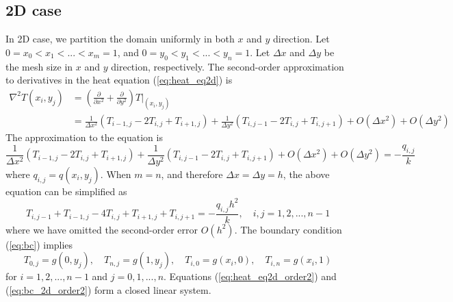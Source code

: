 \documentclass{article}
\begin{document}
\subsection{2D case}
In 2D case, we partition the domain uniformly in both $x$ and $y$ direction. Let $0 = x_0 < x_1 < ... < x_m = 1$,
and $0 = y_0 < y_1 < ... < y_n = 1$. Let $\Delta x$ and $\Delta y$ be the mesh size in $x$ and $y$ direction, respectively. The second-order approximation to derivatives in the heat equation (\ref{eq:heat_eq2d}) is
\begin{equation*}
\begin{split}
    \nabla^2 T(x_i, y_j) & = \left(\frac{\partial}{\partial x^2} + \frac{\partial}{\partial y^2}\right) T|_{(x_i,y_j)} \\
    & = \frac{1}{\Delta x^2}(T_{i-1,j} - 2T_{i,j} + T_{i+1,j}) + \frac{1}{\Delta y^2}(T_{i,j-1} -2T_{i,j} + T_{i,j+1})
    + O(\Delta x^2) + O(\Delta y^2)
\end{split}
\end{equation*}
The approximation to the equation is
\begin{equation*}
    \frac{1}{\Delta x^2}(T_{i-1,j} - 2T_{i,j} + T_{i+1,j}) + \frac{1}{\Delta y^2}(T_{i,j-1} -2T_{i,j} + T_{i,j+1}) + O(\Delta x^2) + O(\Delta y^2) = - \frac{q_{i,j}}{k}
\end{equation*}
where $q_{i,j} = q(x_i,y_j)$.
When $m = n$, and therefore $\Delta x = \Delta y = h$, the above equation can be simplified as
\begin{equation} \label{eq:heat_eq2d_order2}
    T_{i,j-1} + T_{i-1,j} - 4T_{i,j} + T_{i+1,j} + T_{i,j+1} = - \frac{q_{i,j} h^2}{k},
    \quad i, j = 1, 2, ..., n-1
\end{equation}
where we have omitted the second-order error $O(h^2)$. The boundary condition (\ref{eq:bc}) implies
\begin{equation} \label{eq:bc_2d_order2}
    T_{0,j} = g(0,y_j), \quad T_{n,j} = g(1,y_j), \quad T_{i,0} = g(x_i,0), \quad T_{i,n} = g(x_i, 1)
\end{equation}
for $i = 1, 2, ..., n-1$ and $j = 0, 1, ..., n$. Equations (\ref{eq:heat_eq2d_order2}) and (\ref{eq:bc_2d_order2}) form a closed linear system.
\end{document}
